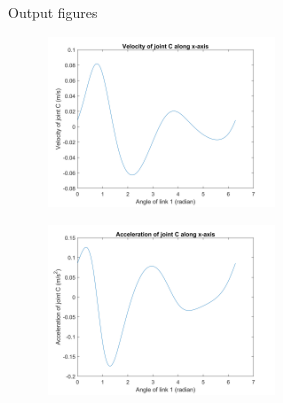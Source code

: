 \begin{frame}{Output figures}
\begin{table}
	\begin{minipage}{0.5\linewidth}
		\begin{figure}
			\centering
			\includegraphics[width=60mm]{images/v_RRRR.png}
		\end{figure}
	\end{minipage}\hfill
	\begin{minipage}{0.5\linewidth}
		\begin{figure}
			\centering
			\includegraphics[width=60mm]{images/a_RRRR.png}
		\end{figure}
	\end{minipage}
\end{table}
\end{frame}